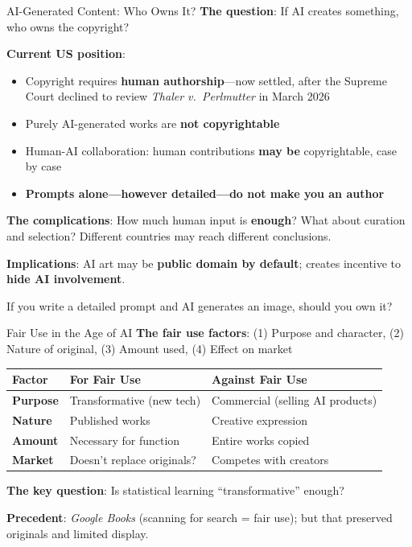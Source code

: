 ﻿\documentclass[aspectratio=169,11pt]{beamer}
\begin{document}
\begin{frame}{AI-Generated Content: Who Owns It?}
\textbf{The question}: If AI creates something, who owns the copyright?

\vspace{0.2cm}
\textbf{Current US position}:
\begin{itemize}
    \item Copyright requires \textbf{human authorship}---now settled, after the Supreme Court declined to review \textit{Thaler v.\ Perlmutter} in March 2026
    \item Purely AI-generated works are \textbf{not copyrightable}
    \item Human-AI collaboration: human contributions \textbf{may be} copyrightable, case by case
    \item \textbf{Prompts alone---however detailed---do not make you an author}
\end{itemize}

\vspace{0.15cm}
\textbf{The complications}: How much human input is \textbf{enough}? What about curation and selection? Different countries may reach different conclusions.

\vspace{0.1cm}
\textbf{Implications}: AI art may be \textbf{public domain by default}; creates incentive to \textbf{hide AI involvement}.

\begin{discussionbox}[Discussion]
If you write a detailed prompt and AI generates an image, should you own it?
\end{discussionbox}
\end{frame}

\begin{frame}{Fair Use in the Age of AI}
\textbf{The fair use factors}: (1) Purpose and character, (2) Nature of original, (3) Amount used, (4) Effect on market

\vspace{0.1cm}
\begin{table}[h]
\centering
\small
\begin{tabular}{>{\bfseries}l p{4cm} p{4cm}}
\toprule
Factor & For Fair Use & Against Fair Use \\
\midrule
Purpose & Transformative (new tech) & Commercial (selling AI products) \\
Nature & Published works & Creative expression \\
Amount & Necessary for function & Entire works copied \\
Market & Doesn't replace originals? & Competes with creators \\
\bottomrule
\end{tabular}
\end{table}

\textbf{The key question}: Is statistical learning ``transformative'' enough?

\textbf{Precedent}: \textit{Google Books} (scanning for search = fair use); but that preserved originals and limited display.
\end{frame}
\end{document}
